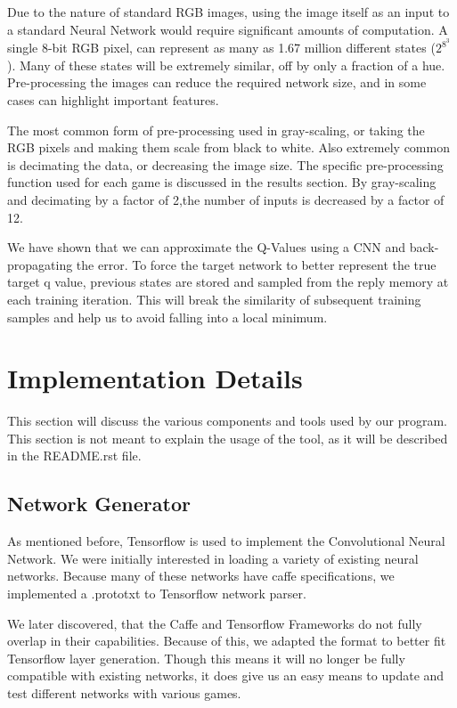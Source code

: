 \documentclass{article}
\begin{document}
Due to the nature of standard RGB images, using the image itself as an input to a standard Neural Network would require significant amounts of computation. A single 8-bit RGB pixel, can represent as many as 1.67 million different states ($2^{8^3}$). Many of these states will be extremely similar, off by only a fraction of a hue. Pre-processing the images can reduce the required network size, and in some cases can highlight important features.

The most common form of pre-processing used in gray-scaling, or taking the RGB pixels and making them scale from black to white. Also extremely common is decimating the data, or decreasing the image size. The specific pre-processing function used for each game is discussed in the results section. By gray-scaling and decimating by a factor of 2,the number of inputs is decreased by a factor of 12.

We have shown that we can approximate the Q-Values using a CNN and back-propagating the error. To force the target network to better represent the true target q value, previous states are stored and sampled from the reply memory at each training iteration. This will break the similarity of subsequent training samples and help us to avoid falling into a local minimum.

\section{Implementation Details}

This section will discuss the various components and tools used by our program. This section is not meant to explain the usage of the tool, as it will be described in the README.rst file.

\subsection{Network Generator}

As mentioned before, Tensorflow is used to implement the Convolutional Neural Network. We were initially interested in loading a variety of existing neural networks. Because many of these networks have caffe specifications, we implemented a .prototxt to Tensorflow network parser. 

We later discovered, that the Caffe and Tensorflow Frameworks do not fully overlap in their capabilities. Because of this, we adapted the format to better fit Tensorflow layer generation. Though this means it will no longer be fully compatible with existing networks, it does give us an easy means to update and test different networks with various games.
\end{document}
